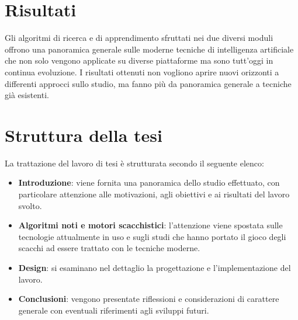 \section{Risultati}
Gli algoritmi di ricerca e di apprendimento sfruttati nei due diversi moduli offrono una panoramica generale sulle moderne tecniche di intelligenza
artificiale che non solo vengono applicate su diverse piattaforme ma sono tutt'oggi in continua evoluzione. 
I risultati ottenuti non vogliono aprire nuovi orizzonti a differenti approcci sullo studio, 
ma fanno più da panoramica generale a tecniche già esistenti.

\section{Struttura della tesi}
La trattazione del lavoro di tesi è strutturata secondo il seguente elenco:
\begin{itemize}
    \item \textbf{Introduzione}: viene fornita una panoramica dello studio effettuato, con particolare attenzione alle motivazioni, 
    agli obiettivi e ai risultati del lavoro svolto.
    \item \textbf{Algoritmi noti e motori scacchistici}: l'attenzione viene spostata sulle tecnologie attualmente in uso e sugli studi 
    che hanno portato il gioco degli scacchi ad essere trattato con le tecniche moderne.
    \item \textbf{Design}: si esaminano nel dettaglio la progettazione e l'implementazione del lavoro.
    \item \textbf{Conclusioni}: vengono presentate riflessioni e considerazioni di carattere generale con eventuali riferimenti
    agli sviluppi futuri.
\end{itemize}
